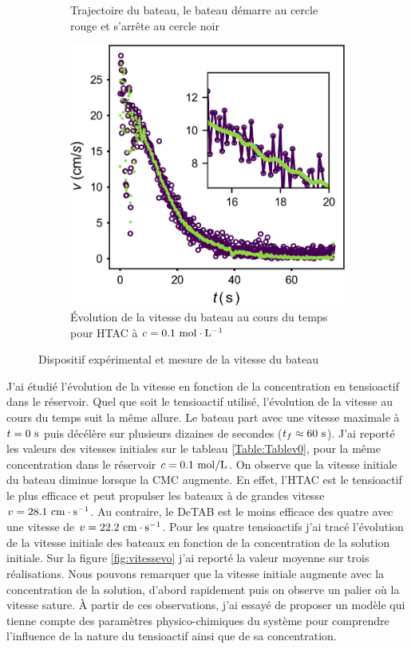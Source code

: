\documentclass[french, 10pt]{article}
\begin{document}
\begin{figure}[ht]
\begin{subfigure}[b]{0.45\textwidth}
\caption{Trajectoire du bateau, le bateau démarre au cercle rouge et s'arrête au cercle noir}
\label{fig:trajectoire}
\end{subfigure}\hfill
\begin{subfigure}[b]{0.45\textwidth}
  \centering
  \includegraphics[width=.7\textwidth]{vitesse_t.png}
\caption{Évolution de la vitesse du bateau au cours du temps pour HTAC à $c=0.1~\rm mol\cdot L^{-1}$}
\label{fig:vitesse}
\end{subfigure}\hfill
\caption{Dispositif expérimental et mesure de la vitesse du bateau}
\end{figure}



J'ai étudié l'évolution de la vitesse en fonction de la concentration en tensioactif dans le réservoir. Quel que soit le tensioactif utilisé, l'évolution de la vitesse au cours du temps suit la même allure. Le bateau part avec une vitesse maximale à $t=0~\rm s$ puis décélère sur plusieurs dizaines de secondes ($t_f\approx 60~\rm s$). J'ai reporté les valeurs des vitesses initiales sur le tableau \ref{Table:Tablev0}, pour la même concentration dans le réservoir $c=0.1~\rm mol/L$. On observe que la vitesse initiale du bateau diminue lorsque la CMC augmente. En effet, l'HTAC est le tensioactif le plus efficace et peut propulser les bateaux à de grandes vitesse $v = 28.1~\rm cm\cdot s^{-1}$. Au contraire, le DeTAB est le moins efficace des quatre avec une vitesse de $v=22.2~\rm cm\cdot s^{-1}$. Pour les quatre tensioactifs j'ai tracé l'évolution de la vitesse initiale des bateaux en fonction de la concentration de la solution initiale. Sur la figure  \ref{fig:vitessevo} j'ai reporté la valeur moyenne sur trois réalisations. Nous pouvons remarquer que la vitesse initiale augmente avec la concentration de la solution, d'abord rapidement puis on observe un palier où la vitesse sature. À partir de ces observations, j'ai essayé de proposer un modèle qui tienne compte des paramètres physico-chimiques du système pour comprendre l'influence de la nature du tensioactif ainsi que de sa concentration.
\end{document}
